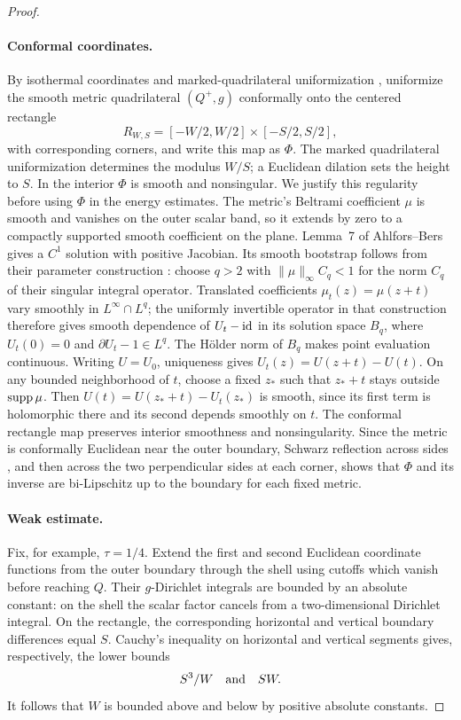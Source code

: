\begin{proof}
\paragraph{Conformal coordinates.}
By isothermal coordinates and marked-quadrilateral uniformization
\cite[Lemma~7 and Theorem~6]{AhlforsBers1960}\cite[Theorem~4.31]{McMullen2023},
uniformize the smooth metric quadrilateral $(Q^+,g)$ conformally onto
the centered rectangle
\[
 R_{W,S}=[-W/2,W/2]\times[-S/2,S/2],
\]
with corresponding corners, and write this map as $\Phi$.  The marked
quadrilateral uniformization determines the modulus $W/S$; a Euclidean
dilation sets the height to $S$.  In the interior $\Phi$ is smooth and
nonsingular. We justify this regularity before using $\Phi$ in the
energy estimates.
The metric's
Beltrami coefficient $\mu$ is smooth and vanishes on the outer scalar
band, so it extends by zero to a compactly supported smooth coefficient
on the plane. Lemma~7 of Ahlfors--Bers gives a $C^1$ solution with
positive Jacobian. Its smooth bootstrap follows from their
parameter construction \cite[Section~2, Theorem~2]{AhlforsBers1960}:
choose $q>2$ with $\|\mu\|_\infty C_q<1$ for the norm $C_q$ of
their singular integral operator. Translated coefficients
$\mu_t(z)=\mu(z+t)$ vary smoothly in $L^\infty\cap L^q$; the
uniformly invertible operator in that construction therefore gives
smooth dependence of $U_t-\operatorname{id}$ in its solution space $B_q$, where
$U_t(0)=0$ and $\partial U_t-1\in L^q$. The H\"older norm of $B_q$
makes point evaluation continuous.
Writing $U=U_0$, uniqueness gives $U_t(z)=U(z+t)-U(t)$. On any bounded neighborhood
of $t$, choose a fixed $z_*$ such that $z_*+t$ stays outside
$\operatorname{supp}\mu$. Then
$U(t)=U(z_*+t)-U_t(z_*)$ is smooth, since its first term is
holomorphic there and its second depends smoothly on $t$.
The conformal rectangle map preserves interior smoothness and
nonsingularity. Since the metric is conformally Euclidean near the outer
boundary, Schwarz reflection across sides
\cite[Chapter~4, Section~6.5, Theorem~24]{Ahlfors1979}, and then across the two
perpendicular sides at each corner, shows that $\Phi$ and its inverse
are bi-Lipschitz up to the boundary for each fixed metric.

\paragraph{Weak estimate.}
Fix, for example, $\tau=1/4$. Extend the first
and second Euclidean coordinate functions from the outer boundary
through the shell using cutoffs which vanish before reaching $Q$.
Their $g$-Dirichlet integrals are bounded by an absolute constant:
on the shell the scalar factor cancels from a two-dimensional
Dirichlet integral.  On the rectangle, the corresponding horizontal
and vertical boundary differences equal $S$.  Cauchy's inequality on
horizontal and vertical segments gives, respectively, the lower bounds
\begin{equation}
 S^3/W\quad\hbox{and}\quad SW.
 \label{lt:rectangle-lower}
\end{equation}
It follows that $W$ is bounded above and below by positive absolute
constants.


\end{proof}
